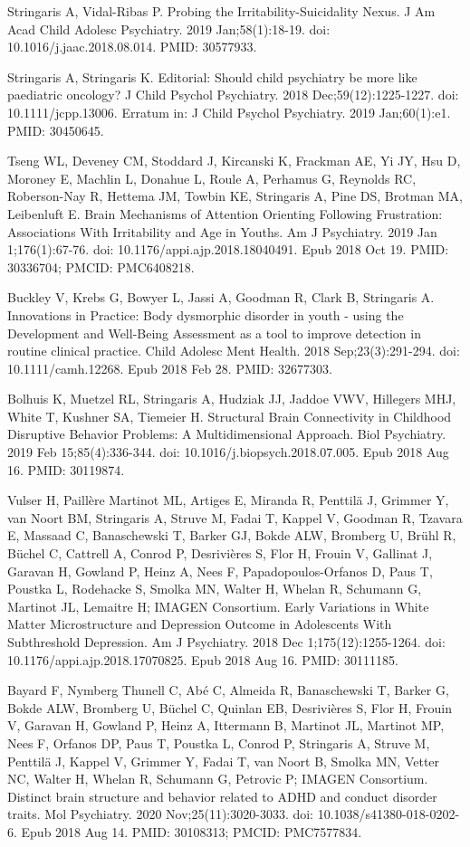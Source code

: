 \documentclass[
]{article}
\begin{document}
Stringaris A, Vidal-Ribas P. Probing the Irritability-Suicidality Nexus.
J Am Acad Child Adolesc Psychiatry. 2019 Jan;58(1):18-19. doi:
10.1016/j.jaac.2018.08.014. PMID: 30577933.

Stringaris A, Stringaris K. Editorial: Should child psychiatry be more
like paediatric oncology? J Child Psychol Psychiatry. 2018
Dec;59(12):1225-1227. doi: 10.1111/jcpp.13006. Erratum in: J Child
Psychol Psychiatry. 2019 Jan;60(1):e1. PMID: 30450645.

Tseng WL, Deveney CM, Stoddard J, Kircanski K, Frackman AE, Yi JY, Hsu
D, Moroney E, Machlin L, Donahue L, Roule A, Perhamus G, Reynolds RC,
Roberson-Nay R, Hettema JM, Towbin KE, Stringaris A, Pine DS, Brotman
MA, Leibenluft E. Brain Mechanisms of Attention Orienting Following
Frustration: Associations With Irritability and Age in Youths. Am J
Psychiatry. 2019 Jan 1;176(1):67-76. doi:
10.1176/appi.ajp.2018.18040491. Epub 2018 Oct 19. PMID: 30336704; PMCID:
PMC6408218.

Buckley V, Krebs G, Bowyer L, Jassi A, Goodman R, Clark B, Stringaris A.
Innovations in Practice: Body dysmorphic disorder in youth - using the
Development and Well-Being Assessment as a tool to improve detection in
routine clinical practice. Child Adolesc Ment Health. 2018
Sep;23(3):291-294. doi: 10.1111/camh.12268. Epub 2018 Feb 28. PMID:
32677303.

Bolhuis K, Muetzel RL, Stringaris A, Hudziak JJ, Jaddoe VWV, Hillegers
MHJ, White T, Kushner SA, Tiemeier H. Structural Brain Connectivity in
Childhood Disruptive Behavior Problems: A Multidimensional Approach.
Biol Psychiatry. 2019 Feb 15;85(4):336-344. doi:
10.1016/j.biopsych.2018.07.005. Epub 2018 Aug 16. PMID: 30119874.

Vulser H, Paillère Martinot ML, Artiges E, Miranda R, Penttilä J,
Grimmer Y, van Noort BM, Stringaris A, Struve M, Fadai T, Kappel V,
Goodman R, Tzavara E, Massaad C, Banaschewski T, Barker GJ, Bokde ALW,
Bromberg U, Brühl R, Büchel C, Cattrell A, Conrod P, Desrivières S, Flor
H, Frouin V, Gallinat J, Garavan H, Gowland P, Heinz A, Nees F,
Papadopoulos-Orfanos D, Paus T, Poustka L, Rodehacke S, Smolka MN,
Walter H, Whelan R, Schumann G, Martinot JL, Lemaitre H; IMAGEN
Consortium. Early Variations in White Matter Microstructure and
Depression Outcome in Adolescents With Subthreshold Depression. Am J
Psychiatry. 2018 Dec 1;175(12):1255-1264. doi:
10.1176/appi.ajp.2018.17070825. Epub 2018 Aug 16. PMID: 30111185.

Bayard F, Nymberg Thunell C, Abé C, Almeida R, Banaschewski T, Barker G,
Bokde ALW, Bromberg U, Büchel C, Quinlan EB, Desrivières S, Flor H,
Frouin V, Garavan H, Gowland P, Heinz A, Ittermann B, Martinot JL,
Martinot MP, Nees F, Orfanos DP, Paus T, Poustka L, Conrod P, Stringaris
A, Struve M, Penttilä J, Kappel V, Grimmer Y, Fadai T, van Noort B,
Smolka MN, Vetter NC, Walter H, Whelan R, Schumann G, Petrovic P; IMAGEN
Consortium. Distinct brain structure and behavior related to ADHD and
conduct disorder traits. Mol Psychiatry. 2020 Nov;25(11):3020-3033. doi:
10.1038/s41380-018-0202-6. Epub 2018 Aug 14. PMID: 30108313; PMCID:
PMC7577834.
\end{document}
